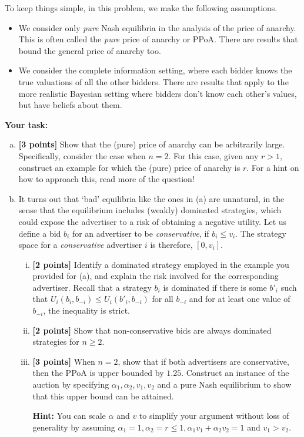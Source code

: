 \documentclass[11pt]{article}
\begin{document}
\vspace{0.1in}
\noindent To keep things simple, in this problem, we make the following assumptions.
\begin{itemize}
\item We consider only \textit{pure} Nash equilibria in the analysis of the price of anarchy. This is often called the \textit{pure} price of anarchy or PPoA. There are results that bound the general price of anarchy too.
\item We consider the complete information setting, where each bidder knows the true valuations of all the other bidders. There are results that apply to the more realistic Bayesian setting where bidders don't know each other's values, but have beliefs about them.
\end{itemize}
\noindent \textbf{Your task:} 
\begin{enumerate}[(a)]
\item \textbf{[3 points]} Show that the (pure) price of anarchy can be arbitrarily large. Specifically, consider the case when $n=2$. For this case, given any $r>1$, construct an example for which the (pure) price of anarchy is $r$. For a hint on how to approach this, read more of the question!


\item It turns out that `bad' equilibria like the ones in (a) are unnatural, in the sense that the equilibrium includes (weakly) dominated strategies, which could expose the advertiser to a risk of obtaining a negative utility. Let us define a bid $b_i$ for an advertiser to be \textit{conservative}, if $b_i\leq v_i$. The strategy space for a \textit{conservative} advertiser $i$ is therefore, $[0,v_i]$.
    \begin{enumerate}[(i)]
    \item \textbf{[2 points]} Identify a dominated strategy employed in the example you provided for (a), and explain the risk involved for the corresponding advertiser. Recall that a strategy $b_i$ is dominated if there is some $b'_i$ such that $U_i(b_i,b_{-i})\leq U_i(b'_i,b_{-i})$ for all $b_{-i}$ and for at least one value of $b_{-i}$, the inequality is strict.
    \item \textbf{[2 points]} Show that non-conservative bids are always dominated strategies for $n \geq 2$.
    \item \textbf{[3 points]} When $n=2$, show that if both advertisers are conservative, then the PPoA is upper bounded by $1.25$. Construct an instance of the auction by specifying $\alpha_1, \alpha_2, v_1, v_2$ and a pure Nash equilibrium to show that this upper bound can be attained.
    
    \textbf{Hint:} You can scale $\alpha$ and $v$ to simplify your argument without loss of generality by assuming $\alpha_1=1,\alpha_2=r\leq 1,\alpha_1v_1+\alpha_2 v_2=1$ and $v_1>v_2$.
   
\end{enumerate}

\end{enumerate}
\end{document}

